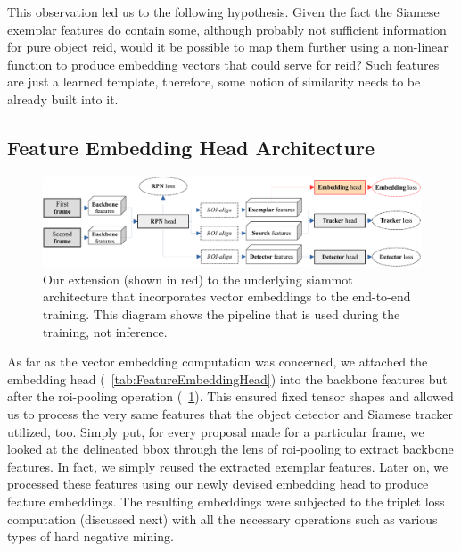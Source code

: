 This observation led us to the following hypothesis. Given the fact the Siamese exemplar features do contain some, although probably not sufficient information for pure object \gls{reid}, would it be possible to map them further using a non-linear function to produce embedding vectors that could serve for \gls{reid}? Such features are just a learned template, therefore, some notion of similarity needs to be already built into it.

\subsection{Feature Embedding Head Architecture}

\begin{figure}[!t]
    \centering
    \includegraphics[width=\linewidth]{figures/siamese_tracking/siammot_feature_emb_training.pdf}
    \caption[Embedding-enhanced \gls{siammot} architecture]{Our extension (shown in red) to the underlying \gls{siammot} architecture that incorporates vector embeddings to the end-to-end training. This diagram shows the pipeline that is used during the training, not inference.}
    \label{fig:SiamMOTWithEmbeddings}
\end{figure}

As far as the vector embedding computation was concerned, we attached the embedding head (\tabletext{}~\ref{tab:FeatureEmbeddingHead}) into the backbone features but after the \gls{roi}-pooling operation (\figtext{}~\ref{fig:SiamMOTWithEmbeddings}). This ensured fixed tensor shapes and allowed us to process the very same features that the object detector and Siamese tracker utilized, too. Simply put, for every proposal made for a particular frame, we looked at the delineated \gls{bbox} through the lens of \gls{roi}-pooling to extract backbone features. In fact, we simply reused the extracted exemplar features. Later on, we processed these features using our newly devised embedding head to produce feature embeddings. The resulting embeddings were subjected to the triplet loss computation (discussed next) with all the necessary operations such as various types of hard negative mining.

